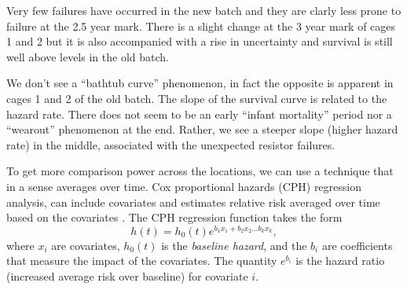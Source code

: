 Very few failures have occurred in the new batch and they are clarly
less prone to failure at the 2.5 year mark. There is a slight change
at the 3 year mark of cages 1 and 2 but it is also accompanied with a
rise in uncertainty and survival is still well above levels in the old
batch.

We don't see a ``bathtub curve'' phenomenon, in fact the opposite is
apparent in cages 1 and 2 of the old batch. The slope of the survival
curve is related to the hazard rate. There does not seem to be an
early ``infant mortality'' period nor a ``wearout'' phenomenon at the
end. Rather, we see a steeper slope (higher hazard rate) in the
middle, associated with the unexpected resistor failures.

To get more comparison power across the locations, we can use a
technique that in a sense averages over time. Cox proportional hazards
(CPH) regression analysis, can include covariates and estimates relative
risk averaged over time based on the covariates
\cite{Cox1972,Harrell2015}. The CPH regression function takes the form
\begin{displaymath}
  h(t) = h_0(t)e^{b_1 x_1 + b_2 x_2 \ldots b_k x_k},
\end{displaymath}
where $x_i$ are covariates, $h_0(t)$ is the {\em baseline hazard}, and
the $b_i$ are coefficients that measure the impact of the
covariates. The quantity $e^{b_i}$ is the hazard ratio (increased
average risk over baseline) for covariate $i$.

